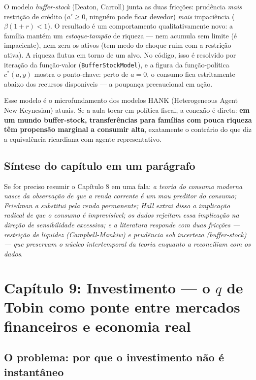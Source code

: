 \documentclass[11pt,a4paper]{article}
\newcommand{\ideia}[1]{\textcolor{destaque}{\textbf{#1}}}
\begin{document}
O modelo \emph{buffer-stock} (Deaton, Carroll) junta as duas fricções:
prudência \emph{mais} restrição de crédito ($a' \geq 0$, ninguém pode
ficar devedor) \emph{mais} impaciência ($\beta(1+r)<1$). O resultado é
um comportamento qualitativamente novo: a família mantém um
\emph{estoque-tampão} de riqueza --- nem acumula sem limite (é
impaciente), nem zera os ativos (tem medo do choque ruim com a
restrição ativa). A riqueza flutua em torno de um alvo. No código, isso
é resolvido por iteração da função-valor (\texttt{BufferStockModel}), e
a figura da função-política $c^*(a,y)$ mostra o ponto-chave: perto de
$a=0$, o consumo fica estritamente abaixo dos recursos disponíveis ---
a poupança precaucional em ação.

Esse modelo é o microfundamento dos modelos HANK (Heterogeneous Agent
New Keynesian) atuais. Se a aula tocar em política fiscal, a conexão é
direta: \ideia{em um mundo buffer-stock, transferências para famílias
com pouca riqueza têm propensão marginal a consumir alta}, exatamente
o contrário do que diz a equivalência ricardiana com agente
representativo.

\subsection{Síntese do capítulo em um parágrafo}

Se for preciso resumir o Capítulo 8 em uma fala: \emph{a teoria do
consumo moderna nasce da observação de que a renda corrente é um mau
preditor do consumo; Friedman a substitui pela renda permanente; Hall
extrai disso a implicação radical de que o consumo é imprevisível; os
dados rejeitam essa implicação na direção de sensibilidade excessiva;
e a literatura responde com duas fricções --- restrição de liquidez
(Campbell-Mankiw) e prudência sob incerteza (buffer-stock) --- que
preservam o núcleo intertemporal da teoria enquanto a reconciliam com
os dados}.

\section{Capítulo 9: Investimento --- o $q$ de Tobin como ponte entre
mercados financeiros e economia real}

\subsection{O problema: por que o investimento não é instantâneo}
\end{document}
